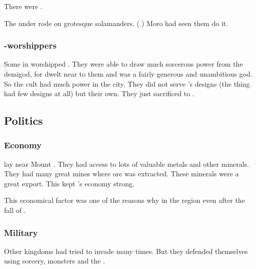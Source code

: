 \subsubsection{\QuilJaaran}
There were .

The \quiljaaran under \Yormis rode on grotesque salamanders. 
(.)
Moro \Cobrel had seen them do it. 









\subsubsection{\Ubloth-worshippers}
Some \rethyaxes in \Yormis worshipped \Ubloth.
They were able to draw much sorcerous power from the demigod, for \Ubloth dwelt near to them and was a fairly generous and unambitious god. 
So the \Ubloth cult had much power in the city. 
They did not serve \Ubloth's designs (the thing had few designs at all) but their own.
They just sacrificed to \Ubloth. 









\subsection{Politics}





\subsubsection{Economy}
\Yormis lay near Mount .
They had access to lots of valuable metals and other minerals. 
They had many great mines where ore was extracted. 
These minerals were a great export.
This kept \Yormis's economy strong. 

This economical factor was one of the reasons why  in the region even after the fall of \Ortaica. 





\subsubsection{Military}
Other kingdoms had tried to invade \Yormis many times. 
But they defended themselves using sorcery, monsters and the \wylde. 

